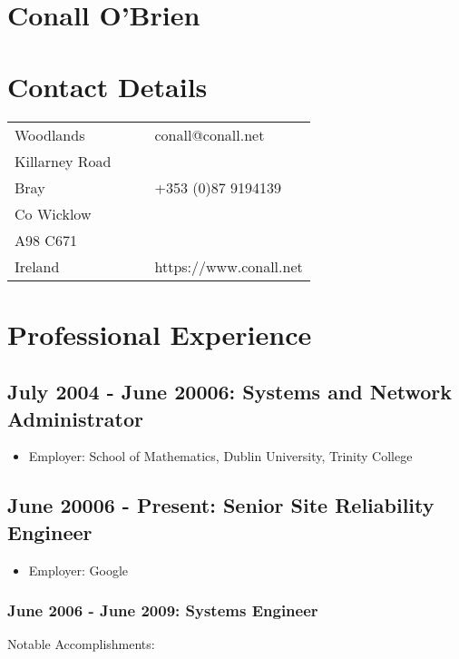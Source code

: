 \documentclass[a4paper, 11pt] {article}
\begin{document}
\section*{Conall O'Brien}

\section*{Contact Details}

\begin{tabular}{l l l l}
Woodlands		&	&			& conall@conall.net 	  	\\
Killarney Road		&	&			&				\\
Bray	 		&	&			& +353 (0)87 9194139 		\\
Co Wicklow		&	&			& 				\\
A98 C671		&	&			& 				\\
Ireland			&  	&			& https://www.conall.net	\\
\end{tabular}

\section*{Professional Experience}

\subsection*{July 2004 - June 20006: Systems and Network Administrator}

\begin{itemize}
\item Employer: School of Mathematics, Dublin University, Trinity College
\end{itemize}

\subsection*{June 20006 - Present: Senior Site Reliability Engineer}

\begin{itemize}
\item Employer: Google
\end{itemize}

\subsubsection*{June 2006 - June 2009: Systems Engineer}

Notable Accomplishments:
\end{document}
